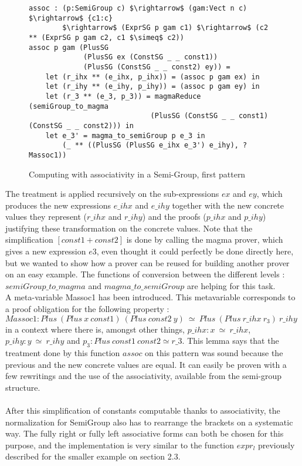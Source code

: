 \begin{figure}[H]
\figrule
\begin{center}
\begin{lstlisting}
assoc : (p:SemiGroup c) $\rightarrow$ (gam:Vect n c) $\rightarrow$ {c1:c} 
        $\rightarrow$ (ExprSG p gam c1) $\rightarrow$ (c2 ** (ExprSG p gam c2, c1 $\simeq$ c2))
assoc p gam (PlusSG 
             (PlusSG ex (ConstSG _ _ const1)) 
             (PlusSG (ConstSG _ _ const2) ey)) =
    let (r_ihx ** (e_ihx, p_ihx)) = (assoc p gam ex) in
    let (r_ihy ** (e_ihy, p_ihy)) = (assoc p gam ey) in
    let (r_3 ** (e_3, p_3)) = magmaReduce (semiGroup_to_magma 
                             (PlusSG (ConstSG _ _ const1) (ConstSG _ _ const2))) in
    let e_3' = magma_to_semiGroup p e_3 in
        (_ ** ((PlusSG (PlusSG e_ihx e_3') e_ihy), ?Massoc1))
\end{lstlisting}
\end{center}
\caption{Computing with associativity in a Semi-Group, first pattern}
\figrule
\end{figure}
The treatment is applied recursively on the sub-expressions $ex$ and $ey$, which produces the new expressions $e\_ihx$ and $e\_ihy$ together with the new concrete values they represent ($r\_ihx$ and $r\_ihy$) and the proofs ($p\_ihx$ and $p\_ihy$) justifying these transformation on the concrete values. Note that the simplification $[const1+const2]$ is done by calling the magma prover, which gives a new expression $e3$, even thought it could perfectly be done directly here, but we wanted to show how a prover can be reused for building another prover on an easy example. The functions of conversion between the different levels : $semiGroup\_to\_magma$ and $magma\_to\_semiGroup$ are helping for this task.
\\
A meta-variable Massoc1 has been introduced. This metavariable corresponds to a proof obligation for the following property :
$Massoc1 : Plus\ (Plus\ x\ const1)\ (Plus\ const2\ y)\ \simeq\ Plus\ (Plus\ r\_ihx\ r_3)\ r\_ihy$ in a context where there is, amongst other things, $p\_ihx : x\ \simeq\ r\_ihx$, $p\_ihy : y\ \simeq\ r\_ihy$ and $p_3 : Plus\ const1\ const2 \simeq r\_3$.
This lemma says that the treatment done by this function $assoc$ on this pattern was sound because the previous and the new concrete values are equal. It can easily be proven with a few rewritings and the use of the associativity, available from the semi-group structure. \\
\\
After this simplification of constants computable thanks to associativity, the normalization for SemiGroup also has to rearrange the brackets on a systematic way. The fully right or fully left associative forms can both be chosen for this purpose, and the implementation is very similar to the function $expr_l$ previously described for the smaller example on section 2.3.

